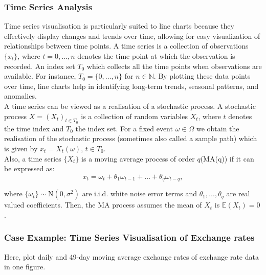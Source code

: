 \documentclass{article}\usepackage[]{graphicx}\usepackage[]{xcolor}
\numberwithin{equation}{section}
\begin{document}
\subsubsection{Time Series Analysis}

Time series visualisation is particularly suited to line charts because they effectively display changes and trends over time, allowing for easy visualization of relationships between time points. A time series\cite{Brockwell2016Introduction} is a collection of observations $\{x_t\}$, where $t=0,\dots,n$ denotes the time point at which the observation is recorded. An index set $T_0$ which collects all the time points when observations are available. For instance, $T_0 = \{0,\dots,n\}$ for $n \in \mathbb{N}$. By plotting these data points over time, line charts help in identifying long-term trends, seasonal patterns, and anomalies.\\

\noindent
A time series can be viewed as a realisation of a stochastic process. A stochastic process\cite{Brockwell2016Introduction} $X = (X_t)_{t \in T_0}$ is a collection of random variables $X_t$, where $t$ denotes the time index and $T_0$ the index set. For a fixed event $\omega \in \Omega$ we obtain the realisation of the stochastic process (sometimes also called a sample path) which is given by $x_t = X_t(\omega)$, $t \in T_0$.\\

\noindent
Also, a time series $\{X_t\}$ is a moving average process of order $q$(MA(q)) if it can be expressed as:
\[x_t = \omega_t + \theta_1 \omega_{t-1}+\dots+ \theta_q \omega_{t-q},\]

\noindent
where $\{\omega_t\} \sim \text{N}(0, \sigma^2)$ are i.i.d. white noise error terms and $\theta_1,\dots,\theta_q$ are real valued coefficients. Then, the MA process assumes the mean of $X_t$ is $\mathbb{E}(X_t)=0$.

\subsubsection{Case Example: Time Series Visualisation of Exchange rates}

Here, plot daily and 49-day moving average exchange rates of exchange rate data in one figure.
\end{document}
